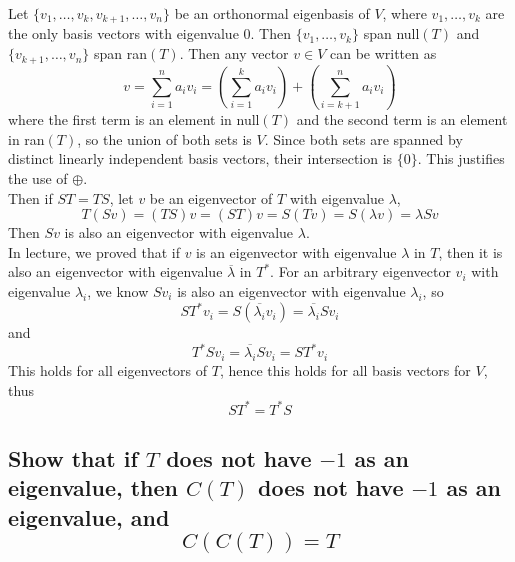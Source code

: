 \documentclass[answers]{exam}
\begin{document}
\begin{questions}
\begin{solution}
	Let $\{v_1,\dots,v_k,v_{k+1},\dots,v_n\}$ be an orthonormal eigenbasis of $V$, where $v_1,\dots,v_k$ are the only basis vectors with eigenvalue 0. Then $\{v_1,\dots,v_k\}$ span null$(T)$ and $\{v_{k+1},\dots,v_n\}$ span ran$(T)$.
	Then any vector $v \in V$ can be written as
	$$v = \sum_{i=1}^n a_iv_i = \left(\sum_{i=1}^k a_iv_i\right) + \left(\sum_{i=k+1}^n a_iv_i\right)$$
	where the first term is an element in null$(T)$ and the second term is an element in ran$(T)$, so the union of both sets is $V$. Since both sets are spanned by distinct linearly independent basis vectors, their intersection is $\{0\}$. This justifies the use of $\oplus$. \\
	Then if $ST=TS$, let $v$ be an eigenvector of $T$ with eigenvalue $\lambda$,
	$$T(Sv) = (TS)v = (ST)v = S(Tv) = S(\lambda v) = \lambda Sv$$
	Then $Sv$ is also an eigenvector with eigenvalue $\lambda$. \\
	In lecture, we proved that if $v$ is an eigenvector with eigenvalue $\lambda$ in $T$, then it is also an eigenvector with eigenvalue $\overline{\lambda}$ in $T^*$. For an arbitrary eigenvector $v_i$ with eigenvalue $\lambda_i$, we know $Sv_i$ is also an eigenvector with eigenvalue $\lambda_i$, so
	$$ST^*v_i = S(\overline{\lambda_i}v_i) = \overline{\lambda_i}Sv_i$$
	and
	$$T^*Sv_i = \overline{\lambda_i}Sv_i = ST^*v_i$$
	This holds for all eigenvectors of $T$, hence this holds for all basis vectors for $V$, thus
	$$ST^* = T^*S$$
\end{solution}


\begin{parts}
	\part{Show that if $T$ does not have $-1$ as an eigenvalue, then $C(T)$ does not have $-1$ as an eigenvalue, and
		$$C(C(T)) = T$$
	}


\end{parts}
\end{questions}
\end{document}
